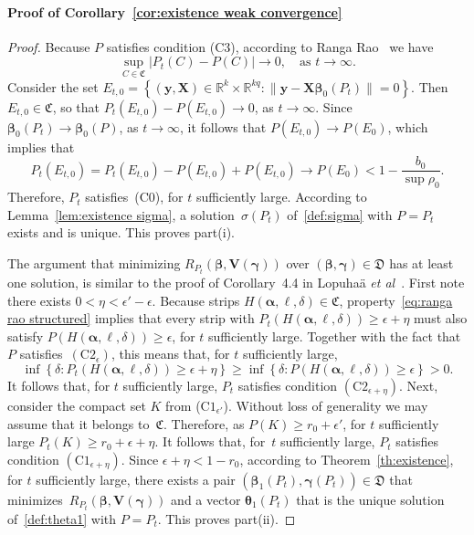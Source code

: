 \documentclass{article}
\numberwithin{equation}{section}
\theoremstyle{plain}
\newcommand{\R}{\mathbb{R}}
\newcommand{\bbeta}{\bm\beta}
\newcommand{\btheta}{\bm\theta}
\newcommand{\balpha}{\bm\alpha}
\newcommand{\bgamma}{\bm\gamma}
\newcommand{\by}{\mathbf{y}}
\newcommand{\bX}{\mathbf{X}}
\newcommand{\bV}{\mathbf{V}}
\begin{document}
\paragraph*{Proof of Corollary~\ref{cor:existence weak convergence}}
\begin{proof}
Because $P$ satisfies condition (C3), according to Ranga Rao~\cite[Theorem 4.2]{rangarao1962} we have
\begin{equation}
\label{eq:ranga rao structured}
\sup_{C\in \mathfrak{C}}
\left|
P_t(C)-P(C)
\right|
\to
0,
\quad
\text{as }t\to\infty.
\end{equation}
Consider the set $E_{t,0}=
\left\{
(\by,\bX)\in\R^k\times\R^{kq}:
\|\by-\bX\bbeta_0(P_t)\|=0
\right\}$.
Then $E_{t,0}\in \mathfrak{C}$,
so that  $P_t(E_{t,0})-P(E_{t,0})\to0$, as $t\to\infty$.
Since $\bbeta_0(P_t)\to\bbeta_0(P)$, as $t\to\infty$,  it follows that $P(E_{t,0})\to P(E_0)$, 
which implies that
\[
P_t(E_{t,0})
=
P_t(E_{t,0})-P(E_{t,0})+P(E_{t,0})\to
P(E_0)
<
1-\frac{b_0}{\sup\rho_0}.
\]
Therefore, $P_t$ satisfies~(C0), for $t$ sufficiently large.
According to Lemma~\ref{lem:existence sigma}, a solution~$\sigma(P_t)$ 
of~\eqref{def:sigma} with $P=P_t$ exists and is unique.
This proves part(i).

The argument that minimizing
$R_{P_t}(\bbeta,\bV(\bgamma))$ over $(\bbeta,\bgamma)\in\mathfrak{D}$
has at least one solution, is similar to the proof of Corollary~4.4 in Lopuha\"a \textit{et al}~\cite{lopuhaa-gares-ruizgazen2023}.
First note there exists $0<\eta<\epsilon'-\epsilon$.
Because strips $H(\balpha,\ell,\delta)\in \mathfrak{C}$,
property~\eqref{eq:ranga rao structured} implies that every strip with $P_t(H(\balpha,\ell,\delta))\geq \epsilon+\eta$
must also satisfy $P(H(\balpha,\ell,\delta))\geq \epsilon$,
for $t$ sufficiently large.
Together with the fact that~$P$ satisfies~$(\text{C2}_{\epsilon})$,
this means that, for $t$ sufficiently large,
\[
\inf
\left\{
\delta:P_t(H(\balpha,\ell,\delta))\geq \epsilon+\eta
\right\}
\geq
\inf
\left\{
\delta:P(H(\balpha,\ell,\delta))\geq \epsilon
\right\}>0.
\]
It follows that, for $t$ sufficiently large, $P_t$ satisfies condition $(\text{C2}_{\epsilon+\eta})$.
Next, consider the compact set $K$ from ($\text{C1}_{\epsilon'}$).
Without loss of generality we may assume that it belongs to~$\mathfrak{C}$.
Therefore,
as $P(K)\geq r_0+\epsilon'$, for $t$ sufficiently large $P_t(K)\geq r_0+\epsilon+\eta$.
It follows that, for~$t$ sufficiently large, $P_t$ satisfies condition $(\text{C1}_{\epsilon+\eta})$.
Since $\epsilon+\eta<1-r_0$, according to Theorem~\ref{th:existence},
for $t$ sufficiently large,
there exists a pair $(\bbeta_1(P_t),\bgamma(P_t))\in \mathfrak{D}$ that minimizes~$R_{P_t}(\bbeta,\bV(\bgamma))$
and a vector $\btheta_1(P_t)$ that is the unique solution of~\eqref{def:theta1} with $P=P_t$.
This proves part(ii).
\end{proof}
\end{document}
